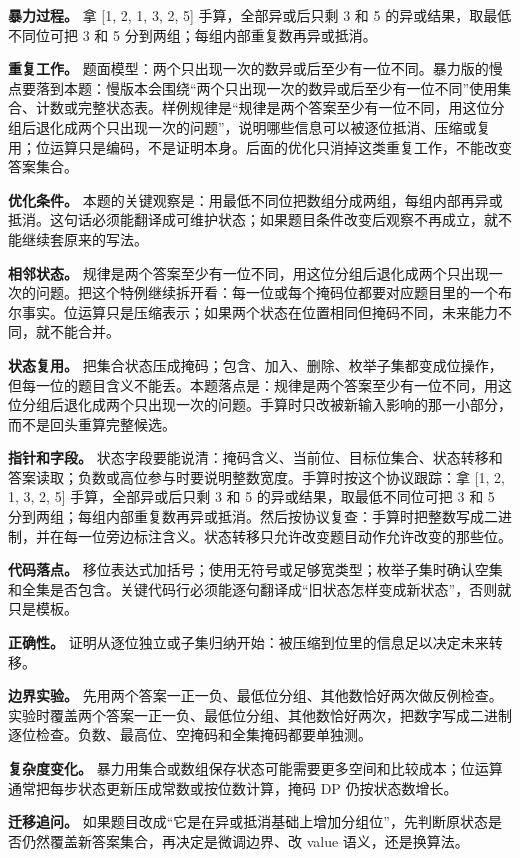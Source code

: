 \textbf{暴力过程。} 拿 [1, 2, 1, 3, 2, 5] 手算，全部异或后只剩 3 和 5 的异或结果，取最低不同位可把 3 和 5 分到两组；每组内部重复数再异或抵消。

\textbf{重复工作。} 题面模型：两个只出现一次的数异或后至少有一位不同。暴力版的慢点要落到本题：慢版本会围绕“两个只出现一次的数异或后至少有一位不同”使用集合、计数或完整状态表。样例规律是“规律是两个答案至少有一位不同，用这位分组后退化成两个只出现一次的问题”，说明哪些信息可以被逐位抵消、压缩或复用；位运算只是编码，不是证明本身。后面的优化只消掉这类重复工作，不能改变答案集合。

\textbf{优化条件。} 本题的关键观察是：用最低不同位把数组分成两组，每组内部再异或抵消。这句话必须能翻译成可维护状态；如果题目条件改变后观察不再成立，就不能继续套原来的写法。

\textbf{相邻状态。} 规律是两个答案至少有一位不同，用这位分组后退化成两个只出现一次的问题。把这个特例继续拆开看：每一位或每个掩码位都要对应题目里的一个布尔事实。位运算只是压缩表示；如果两个状态在位置相同但掩码不同，未来能力不同，就不能合并。

\textbf{状态复用。} 把集合状态压成掩码；包含、加入、删除、枚举子集都变成位操作，但每一位的题目含义不能丢。本题落点是：规律是两个答案至少有一位不同，用这位分组后退化成两个只出现一次的问题。手算时只改被新输入影响的那一小部分，而不是回头重算完整候选。

\textbf{指针和字段。} 状态字段要能说清：掩码含义、当前位、目标位集合、状态转移和答案读取；负数或高位参与时要说明整数宽度。手算时按这个协议跟踪：拿 [1, 2, 1, 3, 2, 5] 手算，全部异或后只剩 3 和 5 的异或结果，取最低不同位可把 3 和 5 分到两组；每组内部重复数再异或抵消。然后按协议复查：手算时把整数写成二进制，并在每一位旁边标注含义。状态转移只允许改变题目动作允许改变的那些位。

\textbf{代码落点。} 移位表达式加括号；使用无符号或足够宽类型；枚举子集时确认空集和全集是否包含。关键代码行必须能逐句翻译成“旧状态怎样变成新状态”，否则就只是模板。

\textbf{正确性。} 证明从逐位独立或子集归纳开始：被压缩到位里的信息足以决定未来转移。

\textbf{边界实验。} 先用两个答案一正一负、最低位分组、其他数恰好两次做反例检查。实验时覆盖两个答案一正一负、最低位分组、其他数恰好两次，把数字写成二进制逐位检查。负数、最高位、空掩码和全集掩码都要单独测。

\textbf{复杂度变化。} 暴力用集合或数组保存状态可能需要更多空间和比较成本；位运算通常把每步状态更新压成常数或按位数计算，掩码 DP 仍按状态数增长。

\textbf{迁移追问。} 如果题目改成“它是在异或抵消基础上增加分组位”，先判断原状态是否仍然覆盖新答案集合，再决定是微调边界、改 value 语义，还是换算法。

